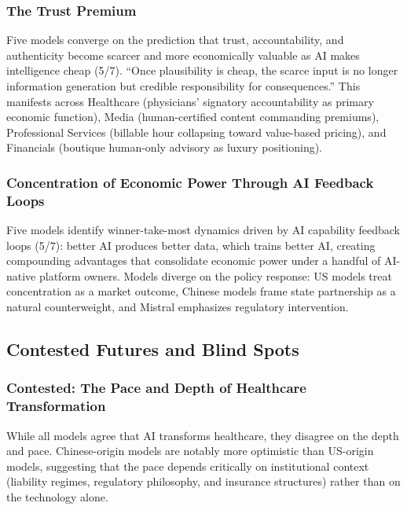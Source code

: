 \documentclass[preprint,review,12pt]{elsarticle}
\begin{document}
\subsubsection{The Trust Premium}
\label{sec:trust_premium}

Five models converge on the prediction that trust, accountability, and authenticity become scarcer and more economically valuable as AI makes intelligence cheap (5/7). ``Once plausibility is cheap, the scarce input is no longer information generation but credible responsibility for consequences.'' This manifests across Healthcare (physicians' signatory accountability as primary economic function), Media (human-certified content commanding premiums), Professional Services (billable hour collapsing toward value-based pricing), and Financials (boutique human-only advisory as luxury positioning).


\subsubsection{Concentration of Economic Power Through AI Feedback Loops}
\label{sec:concentration}

Five models identify winner-take-most dynamics driven by AI capability feedback loops (5/7): better AI produces better data, which trains better AI, creating compounding advantages that consolidate economic power under a handful of AI-native platform owners. Models diverge on the policy response: US models treat concentration as a market outcome, Chinese models frame state partnership as a natural counterweight, and Mistral emphasizes regulatory intervention.


\subsection{Contested Futures and Blind Spots}
\label{sec:contested_futures}


\subsubsection{Contested: The Pace and Depth of Healthcare Transformation}
\label{sec:healthcare_contested}

While all models agree that AI transforms healthcare, they disagree on the depth and pace. Chinese-origin models are notably more optimistic than US-origin models, suggesting that the pace depends critically on institutional context (liability regimes, regulatory philosophy, and insurance structures) rather than on the technology alone.
\end{document}
